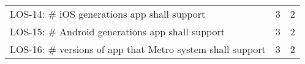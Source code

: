\documentclass[titlepage]{article}
\begin{document}
\begin{table}[h]
\begin{tabularx}{\textwidth}{Xll}
    LOS-14: \# iOS generations app shall support                                                               & 3             & 2              \\
    LOS-15: \# Android generations app shall support                                                           & 3             & 2              \\
    LOS-16: \# versions of app that Metro system shall support                                                 & 3             & 2              \\
    \hline
    \end{tabularx}
\end{table}
		
\end{document}

